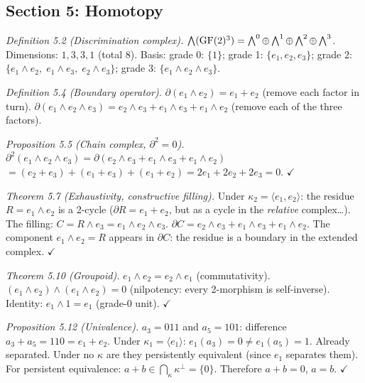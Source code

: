 \subsection{Section 5: Homotopy}

\emph{Definition 5.2 (Discrimination complex).}
$\bigwedge(\operatorname{GF}(2)^3) = \bigwedge^0 \oplus \bigwedge^1
\oplus \bigwedge^2 \oplus \bigwedge^3$.
Dimensions: $1, 3, 3, 1$ (total 8).
Basis: grade 0: $\{1\}$; grade 1: $\{e_1, e_2, e_3\}$;
grade 2: $\{e_1 \wedge e_2,\; e_1 \wedge e_3,\;
e_2 \wedge e_3\}$; grade 3: $\{e_1 \wedge e_2 \wedge
e_3\}$.

\emph{Definition 5.4 (Boundary operator).}
$\partial(e_1 \wedge e_2) = e_1 + e_2$ (remove each
factor in turn). $\partial(e_1 \wedge e_2 \wedge e_3)
= e_2 \wedge e_3 + e_1 \wedge e_3 + e_1 \wedge e_2$
(remove each of the three factors).

\emph{Proposition 5.5 (Chain complex, $\partial^2 = 0$).}
$\partial^2(e_1 \wedge e_2 \wedge e_3)
= \partial(e_2 \wedge e_3 + e_1 \wedge e_3 +
e_1 \wedge e_2)$
$= (e_2 + e_3) + (e_1 + e_3) + (e_1 + e_2)
= 2e_1 + 2e_2 + 2e_3 = 0$. $\checkmark$

\emph{Theorem 5.7 (Exhaustivity, constructive filling).}
Under $\kappa_2 = \langle e_1, e_2 \rangle$: the
residue $R = e_1 \wedge e_2$ is a 2-cycle
($\partial R = e_1 + e_2$, but as a cycle in the
\emph{relative} complex\ldots). The filling:
$C = R \wedge e_3 = e_1 \wedge e_2 \wedge e_3$.
$\partial C = e_2 \wedge e_3 + e_1 \wedge e_3 +
e_1 \wedge e_2$. The component $e_1 \wedge e_2 = R$
appears in $\partial C$: the residue is a boundary in
the extended complex. $\checkmark$

\emph{Theorem 5.10 (Groupoid).}
$e_1 \wedge e_2 = e_2 \wedge e_1$ (commutativity).
$(e_1 \wedge e_2) \wedge (e_1 \wedge e_2) = 0$
(nilpotency: every 2-morphism is self-inverse).
Identity: $e_1 \wedge 1 = e_1$ (grade-0 unit).
$\checkmark$

\emph{Proposition 5.12 (Univalence).}
$a_3 = 011$ and $a_5 = 101$: difference $a_3 + a_5 =
110 = e_1 + e_2$. Under $\kappa_1 = \langle e_1
\rangle$: $e_1(a_3) = 0 \neq e_1(a_5) = 1$. Already
separated. Under no $\kappa$ are they persistently
equivalent (since $e_1$ separates them). For persistent
equivalence: $a + b \in \bigcap_\kappa \kappa^\perp
= \{0\}$. Therefore $a + b = 0$, $a = b$. $\checkmark$

